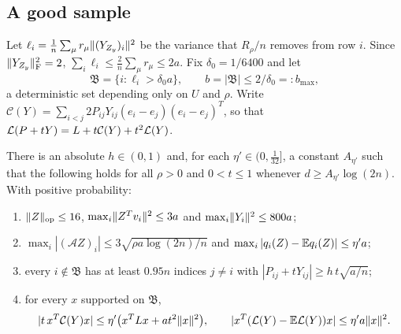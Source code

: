 \subsection{A good sample}

Let $\ell_i=\frac1n\sum_\mu r_\mu\lVert (Y_{Z_y})_i\rVert^2$ be the variance that $R_\rho/n$
removes from row $i$. Since $\lVert Y_{Z_y}\rVert_{\mathrm F}^2=2$, $\sum_i\ell_i\le\frac2n\sum_\mu
r_\mu\le2a$. Fix $\delta_0=1/6400$ and let
\[
 \mathfrak B=\{i:\ell_i>\delta_0a\},\qquad b=|\mathfrak B|\le2/\delta_0=:b_{\max},
\]
a deterministic set depending only on $U$ and $\rho$. Write
$\mathcal C(Y)=\sum_{i<j}2P_{ij}Y_{ij}(e_i-e_j)(e_i-e_j)^T$, so that
$\mathcal L(P+tY)=L+t\mathcal C(Y)+t^2\mathcal L(Y)$.

\begin{lemma}\label{lem:sample}
There is an absolute $h\in(0,1)$ and, for each $\eta'\in(0,\frac1{32}]$, a
constant $A_{\eta'}$ such that the following holds for all $\rho>0$ and
$0<t\le1$ whenever $d\ge A_{\eta'}\log(2n)$. With positive probability:
\begin{enumerate}[label=\textup{(S\arabic*)}]
\item\label{S1} $\lVert Z\rVert_{\mathrm{op}}\le16$, $\max_i\lVert Z^Tv_i\rVert^2\le3a$ and
$\max_i\lVert Y_i\rVert^2\le800a$;
\item\label{S2} $\max_i|(\mathcal AZ)_i|\le3\sqrt{\rho a\log(2n)/n}$ and
$\max_i|q_i(Z)-\mathbb E q_i(Z)|\le\eta'a$;
\item\label{S3} every $i\notin\mathfrak B$ has at least $0.95n$ indices
$j\ne i$ with $|P_{ij}+tY_{ij}|\ge h\,t\sqrt{a/n}$;
\item\label{S4} for every $x$ supported on $\mathfrak B$,
\[
 |t\,x^T\mathcal C(Y)x|\le\eta'\bigl(x^TLx+at^2\lVert x\rVert^2\bigr),\qquad
 |x^T(\mathcal L(Y)-\mathbb E\mathcal L(Y))x|\le\eta'a\lVert x\rVert^2 .
\]
\end{enumerate}
\end{lemma}

